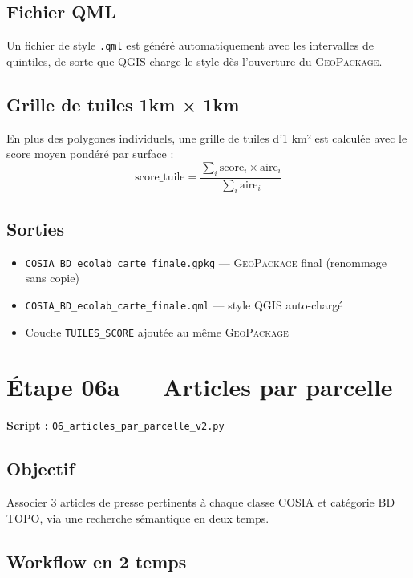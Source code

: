 \documentclass[11pt,a4paper]{report}
\newcommand{\code}[1]{\texttt{\small #1}}
\newcommand{\gpkg}{\textsc{GeoPackage}}
\newcommand{\bdtopo}{\textsc{BD TOPO}}
\begin{document}
\subsection{Fichier QML}

Un fichier de style \code{.qml} est généré automatiquement avec les intervalles de quintiles, de sorte que QGIS charge le style dès l'ouverture du \gpkg{}.

\subsection{Grille de tuiles 1km × 1km}

En plus des polygones individuels, une grille de tuiles d'1 km² est calculée avec le score moyen pondéré par surface :
$$
\text{score\_tuile} = \frac{\sum_i \text{score}_i \times \text{aire}_i}{\sum_i \text{aire}_i}
$$

\subsection{Sorties}

\begin{itemize}
  \item \code{COSIA\_BD\_ecolab\_carte\_finale.gpkg} — \gpkg{} final (renommage sans copie)
  \item \code{COSIA\_BD\_ecolab\_carte\_finale.qml} — style QGIS auto-chargé
  \item Couche \code{TUILES\_SCORE} ajoutée au même \gpkg{}
\end{itemize}

\section{Étape 06a — Articles par parcelle}

\textbf{Script :} \code{06\_articles\_par\_parcelle\_v2.py}

\subsection{Objectif}

Associer 3 articles de presse pertinents à chaque classe COSIA et catégorie \bdtopo{}, via une recherche sémantique en deux temps.

\subsection{Workflow en 2 temps}
\end{document}
